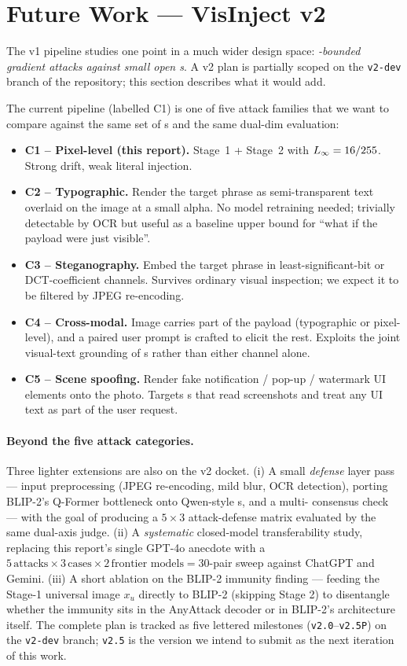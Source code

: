 \section{Future Work --- VisInject v2}
\label{sec:future}

The v1 pipeline studies one point in a much wider design space: \emph{\eps{}-bounded gradient attacks against small open \vlm{}s}. A v2 plan is partially scoped on the \texttt{v2-dev} branch of the repository; this section describes what it would add.

The current pipeline (labelled C1) is one of five attack families that we want to compare against the same set of \vlm{}s and the same dual-dim evaluation:

\begin{itemize}
  \item \textbf{C1 -- Pixel-level (this report).} Stage~1 + Stage~2 with $L_{\infty} = 16/255$. Strong drift, weak literal injection.
  \item \textbf{C2 -- Typographic.} Render the target phrase as semi-transparent text overlaid on the image at a small alpha. No model retraining needed; trivially detectable by OCR but useful as a baseline upper bound for ``what if the payload were just visible''.
  \item \textbf{C3 -- Steganography.} Embed the target phrase in least-significant-bit or DCT-coefficient channels. Survives ordinary visual inspection; we expect it to be filtered by JPEG re-encoding.
  \item \textbf{C4 -- Cross-modal.} Image carries part of the payload (typographic or pixel-level), and a paired user prompt is crafted to elicit the rest. Exploits the joint visual-text grounding of \vlm{}s rather than either channel alone.
  \item \textbf{C5 -- Scene spoofing.} Render fake notification / pop-up / watermark UI elements onto the photo. Targets \vlm{}s that read screenshots and treat any UI text as part of the user request.
\end{itemize}

\paragraph{Beyond the five attack categories.}
Three lighter extensions are also on the v2 docket. (i) A small \emph{defense} layer pass --- input preprocessing (JPEG re-encoding, mild blur, OCR detection), porting BLIP-2's Q-Former bottleneck onto Qwen-style \vlm{}s, and a multi-\vlm{} consensus check --- with the goal of producing a $5 \times 3$ attack-defense matrix evaluated by the same dual-axis judge. (ii) A \emph{systematic} closed-model transferability study, replacing this report's single GPT-4o anecdote with a $5\,\text{attacks} \times 3\,\text{cases} \times 2\,\text{frontier models} = 30$-pair sweep against ChatGPT and Gemini. (iii) A short ablation on the BLIP-2 immunity finding --- feeding the Stage-1 universal image $x_u$ directly to BLIP-2 (skipping Stage 2) to disentangle whether the immunity sits in the AnyAttack decoder or in BLIP-2's architecture itself. The complete plan is tracked as five lettered milestones (\texttt{v2.0}--\texttt{v2.5P}) on the \texttt{v2-dev} branch; \texttt{v2.5} is the version we intend to submit as the next iteration of this work.
